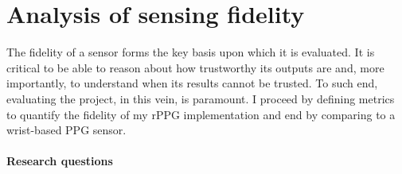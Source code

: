 

\section{Analysis of sensing fidelity}
The fidelity of a sensor forms the key basis upon which it is evaluated. It is critical to be able to reason about how trustworthy its outputs are and, more importantly, to understand
when its results cannot be trusted. To such end, evaluating the project, in this vein, is paramount. I proceed by defining metrics to quantify the fidelity of my rPPG implementation and end by comparing to a wrist-based PPG sensor.

\paragraph{Research questions}


